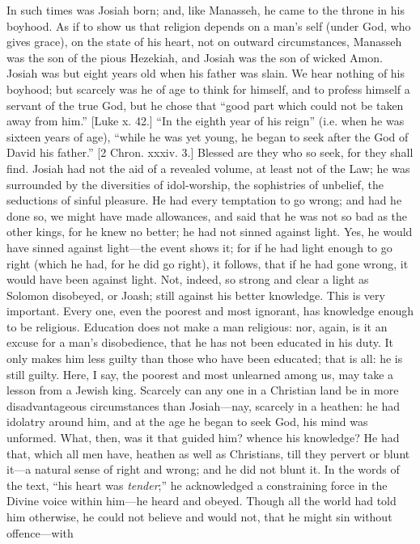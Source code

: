 In such times was Josiah born; and, like Manasseh, he came to the
throne in his boyhood. As if to show us that religion depends on a
man's self (under God, who gives grace), on the state of his heart,
not on outward circumstances, Manasseh was the son of the pious
Hezekiah, and Josiah was the son of wicked Amon. Josiah was but eight
years old when his father was slain. We hear nothing of his boyhood;
but scarcely was he of age to think for himself, and to profess
himself a servant of the true God, but he chose that ``good part
which could not be taken away from him.'' [Luke x. 42.] ``In
the eighth year of his reign'' (i.e. when he was sixteen years of
age), ``while he was yet young, he began to seek after the God of
David his father.'' [2 Chron. xxxiv. 3.] Blessed are they who so
seek, for they shall find. Josiah had not the aid of a revealed
volume, at least not of the Law; he was surrounded by the diversities
of idol-worship, the sophistries of unbelief, the seductions of sinful
pleasure. He had every temptation to go wrong; and had he done so, we
might have made allowances, and said that he was not so bad as the
other kings, for he knew no better; he had not sinned against light.
Yes, he would have sinned against light—the event shows it; for if
he had light enough to go right (which he had, for he did go right),
it follows, that if he had gone wrong, it would have been against
light. Not, indeed, so strong and clear a light as Solomon disobeyed,
or Joash; still against his better knowledge. This is very important.
Every one, even the poorest and most ignorant, has knowledge enough to
be religious. Education does not make a man religious: nor, again, is
it an excuse for a man's disobedience, that he has not been educated
in his duty. It only makes him less guilty than those who have been
educated; that is all: he is still guilty. Here, I say, the poorest
and most unlearned among us, may take a lesson from a Jewish king.
Scarcely can any one in a Christian land be in more disadvantageous
circumstances than Josiah—nay, scarcely in a heathen: he had
idolatry around him, and at the age he began to seek God, his mind was
unformed. What, then, was it that guided him? whence his knowledge? He
had that, which all men have, heathen as well as Christians, till they
pervert or blunt it—a natural sense of right and wrong; and he did
not blunt it. In the words of the text, ``his heart was \emph{tender};''
he acknowledged a constraining force in the Divine voice within him—he
heard and obeyed. Though all the world had told him otherwise, he
could not believe and would not, that he might sin without offence—with
